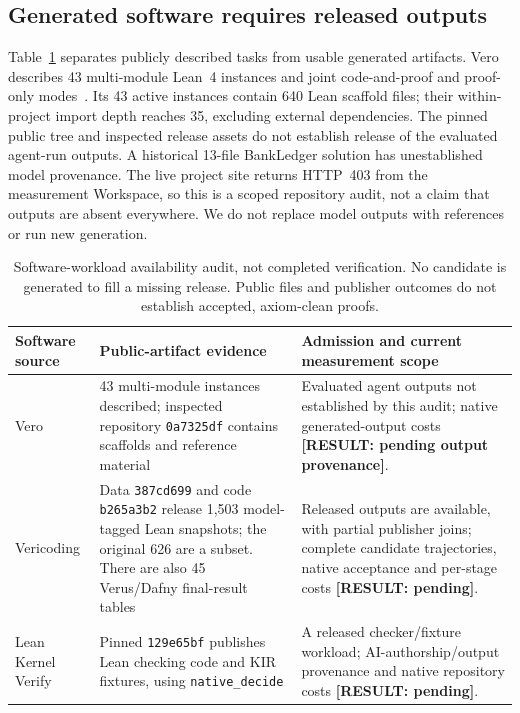 \documentclass[10pt,twocolumn]{article}
\newcommand{\missing}[1]{\textbf{[RESULT: #1]}}
\begin{document}
\subsection{Generated software requires released outputs}
Table~\ref{tab:software} separates publicly described tasks from usable
generated artifacts. Vero describes 43 multi-module Lean~4 instances and
joint code-and-proof and proof-only modes~\cite{vero2026}.
Its 43 active instances contain 640 Lean scaffold files; their
within-project import depth reaches 35, excluding external dependencies.
The pinned public tree and inspected release assets do not establish release
of the evaluated agent-run outputs. A historical 13-file BankLedger solution
has unestablished model provenance. The live project site returns HTTP~403
from the measurement Workspace, so this is a scoped repository audit,
not a claim that outputs are absent everywhere.
We do not replace model outputs with references or run new generation.

\begin{table}[t]
\centering\small
\begin{tabular}{p{}p{}p{}}
\toprule
Software source & Public-artifact evidence & Admission and current measurement scope\\
\midrule
Vero & 43 multi-module instances described; inspected repository
\texttt{0a7325df} contains scaffolds and reference material &
Evaluated agent outputs not established by this audit; native
generated-output costs \missing{pending output provenance}.\\
Vericoding & Data \texttt{387cd699} and code \texttt{b265a3b2}
release 1,503 model-tagged Lean snapshots; the original 626 are a subset.
There are also 45 Verus/Dafny final-result tables &
Released outputs are available, with partial publisher joins; complete
candidate trajectories, native acceptance and per-stage costs
\missing{pending}.\\
Lean Kernel Verify & Pinned \texttt{129e65bf} publishes Lean checking code
and KIR fixtures, using \texttt{native\_decide} &
A released checker/fixture workload; AI-authorship/output provenance and
native repository costs \missing{pending}.\\
\bottomrule
\end{tabular}
\caption{Software-workload availability audit, not completed verification.
No candidate is generated to fill a missing release. Public files and
publisher outcomes do not establish accepted, axiom-clean proofs.}
\label{tab:software}
\end{table}
\end{document}
